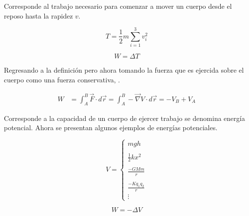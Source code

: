 \documentclass[/home/hernan-barquero/Documents/Apuntes_mecanica_teorica/main.tex]{subfiles}
\begin{document}
	\begin{definition} Corresponde al trabajo necesario para comenzar a mover un cuerpo desde el reposo hasta la rapidez $v$.

		\begin{equation} 
			T =  \frac{1}{2} m \sum_{i=1}^{3} v_{i}^{2}
			\label{eq: Ttras}
		\end{equation}
	\end{definition}

	\begin{theorem}

		\begin{equation}
			W = \Delta T
			\label{eq: workT}
		\end{equation}
		
	\end{theorem}

	Regresando a la definición  pero ahora tomando la fuerza que es ejercida sobre el cuerpo como una fuerza conservativa, .

	\begin{align*}
		W &= \int_{A}^{B} \vec{F} \cdot d\vec{r} =  \int_{A}^{B} - \vec{\nabla}V \cdot d\vec{r} = -V_{B} + V_{A}
	\end{align*}

	\begin{definition} Corresponde a la capacidad de un cuerpo de ejercer trabajo se denomina energía potencial. Ahora se presentan algunos ejemplos de energías potenciales.

		\begin{equation}
			V = \left \{ \begin{matrix}
				mgh\\ 
				\\
				\frac{1}{2}kx^{2} \\
				\\
				\frac{-GMm}{r}\\ 
				\\
				\frac{-Kq_{1}q_{2}}{r}\\ 
				\vdots 
				\end{matrix} \right .
		\end{equation}
	\end{definition}

	\begin{theorem}

		\begin{equation}
			W = - \Delta V
			\label{eq: workV}
		\end{equation}
		
	\end{theorem}
\end{document}
